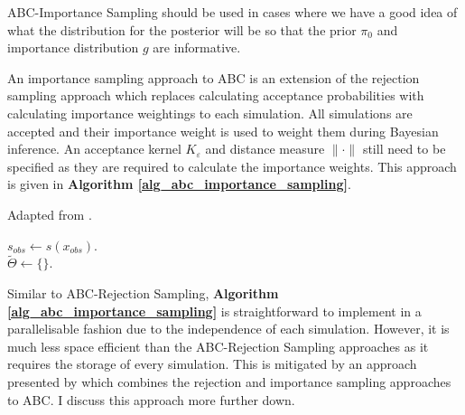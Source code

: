 \documentclass[11pt,a4paper]{article}
\theoremstyle{break}
\begin{document}
  \par ABC-Importance Sampling should be used in cases where we have a good idea of what the distribution for the posterior will be so that the prior $\pi_0$ and importance distribution $g$ are informative.

  \par An importance sampling approach to ABC is an extension of the rejection sampling approach which replaces calculating acceptance probabilities with calculating importance weightings to each simulation. All simulations are accepted and their importance weight is used to weight them during Bayesian inference. An acceptance kernel $K_\varepsilon$ and distance measure $\|\cdot\|$ still need to be specified as they are required to calculate the importance weights. This approach is given in \textbf{Algorithm \ref{alg_abc_importance_sampling}}.

  \begin{box_algorithm}\label{alg_abc_importance_sampling}
    Adapted from \cite[]{abc_samplers}.
    \par
    \begin{algorithm}[H]
      $s_{obs}\leftarrow s(x_{obs})$.\\
      $\tilde\Theta\leftarrow\{\}$.\\
    \end{algorithm}
  \end{box_algorithm}

  \par Similar to ABC-Rejection Sampling, \textbf{Algorithm \ref{alg_abc_importance_sampling}} is straightforward to implement in a parallelisable fashion due to the independence of each simulation. However, it is much less space efficient than the ABC-Rejection Sampling approaches as it requires the storage of every simulation. This is mitigated by an approach presented by \cite[]{constructing_summary_statistics_for_approximate_bayesian_computation_semi_automatic_ABC} which combines the rejection and importance sampling approaches to ABC. I discuss this approach more further down.
\end{document}
